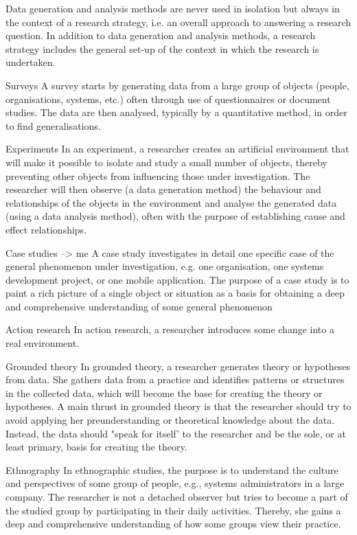Data generation and analysis methods are never used in isolation but
always in the context of a research strategy, i.e. an overall approach
to answering a research question. In addition to data generation and
analysis methods, a research strategy includes the general set-up of
the context in which the research is undertaken.

Surveys
A survey starts by generating data from a large group of objects
(people, organisations, systems, etc.) often through use of questionnaires
or document studies. The data are then analysed, typically by
a quantitative method, in order to find generalisations.

Experiments
In an experiment, a researcher creates an artificial environment that
will make it possible to isolate and study a small number of objects,
thereby preventing other objects from influencing those under investigation.
The researcher will then observe (a data generation
method) the behaviour and relationships of the objects in the environment
and analyse the generated data (using a data analysis
method), often with the purpose of establishing cause and effect relationships.

Case studies --> me
A case study investigates in detail one specific case of the general
phenomenon under investigation, e.g. one organisation, one systems
development project, or one mobile application. The purpose of a
case study is to paint a rich picture of a single object or situation as a
basis for obtaining a deep and comprehensive understanding of
some general phenomenon

Action research
In action research, a researcher introduces some change into a real
environment.

Grounded theory
In grounded theory, a researcher generates theory or hypotheses
from data. She gathers data from a practice and identifies patterns or
structures in the collected data, which will become the base for creating
the theory or hypotheses. A main thrust in grounded theory is
that the researcher should try to avoid applying her preunderstanding
or theoretical knowledge about the data. Instead, the
data should "speak for itself' to the researcher and be the sole, or at
least primary, basis for creating the theory.

Ethnography
In ethnographic studies, the purpose is to understand the culture
and perspectives of some group of people, e.g., systems administrators
in a large company. The researcher is not a detached observer
but tries to become a part of the studied group by participating in
their daily activities. Thereby, she gains a deep and comprehensive
understanding of how some groups view their practice.

